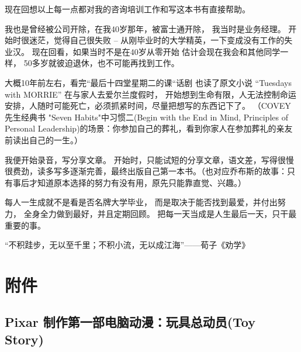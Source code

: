 {\begin{minipage}[t]{0.97\columnwidth}
现在回想以上每一点都对我的咨询培训工作和写这本书有直接帮助。

\begin{description}
\item[]
\begin{description}
\tightlist
\item[]
= = =
\end{description}
\end{description}

我也是曾经被公司开除，在我40岁那年，被富士通开除， 我当时是业务经理。
开始时很迷茫，觉得自己很失败 --
从刚毕业时的大学精英，一下变成没有工作的失业汉。
现在回看，如果当时不是在40岁从零开始 估计会现在我会和其他同学一样，
50多岁就彼迫退休，也不可能再找到工作。\\

\begin{description}
\item[]
\begin{description}
\tightlist
\item[]
= = =
\end{description}
\end{description}

大概10年前左右，看完``最后十四堂星期二的课``话剧 也读了原文小说
``Tuesdays with MORRIE'' 在与家人去爱尔兰度假时，
开始想到生命有限，人无法控制命运安排，人随时可能死亡，必须抓紧时间，尽量把想写的东西记下了。
（COVEY 先生经典书 "Seven Habits"中习惯二(Begin with the End in Mind,
Principles of Personal
Leadership)的场景：你参加自己的葬礼，看到你家人在参加葬礼的亲友前读出自己的一生。）

我便开始录音，写分享文章。 开始时，只能试短的分享文章，语文差，写得很慢很费劲，读多写多逐渐完善，最终出版自己第一本书。（也对应乔布斯的故事：只有事后才知道原本选择的努力有没有用，原先只能靠直觉、兴趣。）

每人一生成就不是看是否名牌大学毕业，
而是取决于能否找到最爱，并付出努力， 全身全力做到最好，并且定期回顾。
把每一天当成是人生最后一天，只干最重要的事。

“不积跬步，无以至千里；不积小流，无以成江海”——荀子《劝学》
\strut
\end{minipage}}

\hypertarget{ux9644ux4ef6}{%
\section{附件}\label{ux9644ux4ef6}}

\hypertarget{pixar-ux5236ux4f5cux7b2cux4e00ux90e8ux7535ux8111ux52a8ux6f2bux73a9ux5177ux603bux52a8ux5458toy-story}{%
\subsection{Pixar 制作第一部电脑动漫：玩具总动员(Toy
Story)}\label{pixar-ux5236ux4f5cux7b2cux4e00ux90e8ux7535ux8111ux52a8ux6f2bux73a9ux5177ux603bux52a8ux5458toy-story}}

